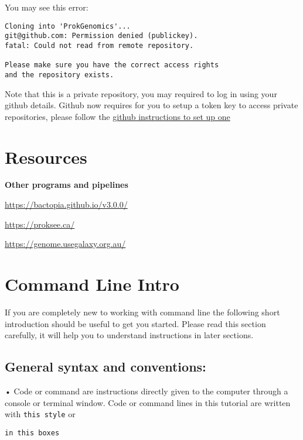\documentclass[
]{book}
\begin{document}
You may see this error:

\begin{verbatim}
Cloning into 'ProkGenomics'...
git@github.com: Permission denied (publickey).
fatal: Could not read from remote repository.

Please make sure you have the correct access rights
and the repository exists.
\end{verbatim}

Note that this is a private repository, you may required to log in using your github details. Github now requires for you to setup a token key to access private repositories, please follow the \href{https://docs.github.com/en/authentication/keeping-your-account-and-data-secure/managing-your-personal-access-tokens}{github instructions to set up one}

\hypertarget{resources}{%
\chapter{Resources}\label{resources}}

\textbf{Other programs and pipelines}

\url{https://bactopia.github.io/v3.0.0/}

\url{https://proksee.ca/}

\url{https://genome.usegalaxy.org.au/}

\hypertarget{command-line-intro}{%
\chapter{Command Line Intro}\label{command-line-intro}}

If you are completely new to working with command line the following short introduction should be useful to get you started. Please read this section carefully, it will help you to understand instructions in later sections.

\hypertarget{general-syntax-and-conventions}{%
\section{General syntax and conventions:}\label{general-syntax-and-conventions}}

• Code or command are instructions directly given to the computer through a console or terminal window. Code or command lines in this tutorial are written with \texttt{this\ style} or

\begin{verbatim}
in this boxes
\end{verbatim}
\end{document}
